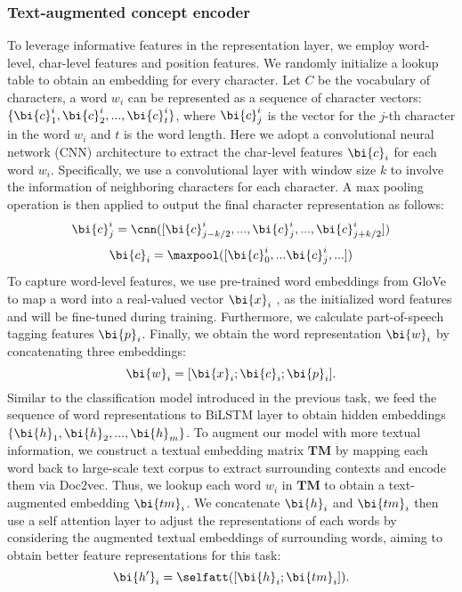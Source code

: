 \subsubsection{Text-augmented concept encoder}
To leverage informative features in the representation layer,
we employ word-level, char-level features and position features.
We randomly initialize a lookup table to obtain an embedding for every character. Let $C$ be the vocabulary of characters, a word $w_i$ can be represented as a sequence of character vectors: $\{\bi{c}_1^i, \bi{c}_2^i, ..., \bi{c}_t^i\}$, where $\bi{c}_j^i$ is the vector for the $j$-th character in the word $w_i$ and $t$ is the word length. 
Here we adopt a convolutional neural network (CNN)  architecture to extract the char-level features $\bi{c}_i$ for each word $w_i$. 
Specifically, we use a convolutional layer with window size $k$ to involve the information of neighboring characters for each character.
A max pooling operation is then applied to output the final character representation as follows:
\begin{equation}
	 \bi{c}^i_j = \cnn([\bi{c}_{j-k/2}^i, ..., \bi{c}_j^i, ..., \bi{c}_{j+k/2}^i])
\end{equation}
\begin{equation}
	\bi{c}_i = \maxpool([\bi{c}^i_0, ... \bi{c}^i_j, ...]) 
\end{equation}
To capture word-level features, we use pre-trained word embeddings from GloVe \cite{pennington2014glove} to map a word into a real-valued vector $\bi{x}_i$ , as the initialized word features and will be fine-tuned during training. 
Furthermore,
we calculate part-of-speech tagging features $\bi{p}_i$.
Finally, we obtain the word representation $\bi{w}_i$ by concatenating three embeddings:
\begin{equation}
\bi{w}_i =[\bi{x}_i;\bi{c}_i;\bi{p}_i].
\end{equation}
Similar to the classification model introduced in the previous task,
we feed the sequence of word representations to BiLSTM layer to obtain hidden embeddings $\{\bi{h}_1, \bi{h}_2, ..., \bi{h}_m\}$.
To augment our model with more textual information,
we construct a textual embedding matrix $\textbf{TM}$ by mapping each word back to large-scale text corpus to extract surrounding contexts and encode them via Doc2vec.
Thus, we lookup each word $w_i$ in $\textbf{TM}$ to obtain a text-augmented embedding $\bi{tm}_i$.
We concatenate $\bi{h}_i$ and $\bi{tm}_i$ then use a self attention layer to adjust the representations of each words by considering the augmented textual embeddings of surrounding words, aiming to obtain better feature representations for this task:
\begin{equation}
\bi{h'}_i =\selfatt([\bi{h}_i;\bi{tm}_i]).
\end{equation}


